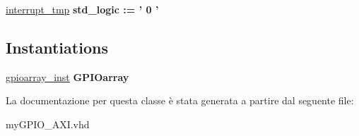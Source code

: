 \begin{DoxyCompactItemize}
\item 
\hypertarget{classmy_g_p_i_o___a_x_i_1_1arch__imp_gad7f656c91324519f1ad5d25d903037b1}{\hyperlink{group___a_x_i-internal_gad7f656c91324519f1ad5d25d903037b1}{interrupt\+\_\+tmp} {\bfseries \textcolor{vhdlchar}{std\+\_\+logic}\textcolor{vhdlchar}{ }\textcolor{vhdlchar}{ }\textcolor{vhdlchar}{\+:}\textcolor{vhdlchar}{=}\textcolor{vhdlchar}{ }\textcolor{vhdlchar}{ }\textcolor{vhdlchar}{'}\textcolor{vhdlchar}{ } \textcolor{vhdldigit}{0} \textcolor{vhdlchar}{ }\textcolor{vhdlchar}{'}\textcolor{vhdlchar}{ }} }\label{classmy_g_p_i_o___a_x_i_1_1arch__imp_gad7f656c91324519f1ad5d25d903037b1}

\end{DoxyCompactItemize}
\subsection*{Instantiations}
 \begin{DoxyCompactItemize}
\item 
\hypertarget{classmy_g_p_i_o___a_x_i_1_1arch__imp_aa9405ada469e1caaeffbfe0b4d9c061e}{\hyperlink{classmy_g_p_i_o___a_x_i_1_1arch__imp_aa9405ada469e1caaeffbfe0b4d9c061e}{gpioarray\+\_\+inst}  {\bfseries G\+P\+I\+Oarray}   }\label{classmy_g_p_i_o___a_x_i_1_1arch__imp_aa9405ada469e1caaeffbfe0b4d9c061e}

\end{DoxyCompactItemize}


La documentazione per questa classe è stata generata a partire dal seguente file\+:\begin{DoxyCompactItemize}
\item 
my\+G\+P\+I\+O\+\_\+\+A\+X\+I.\+vhd\end{DoxyCompactItemize}
